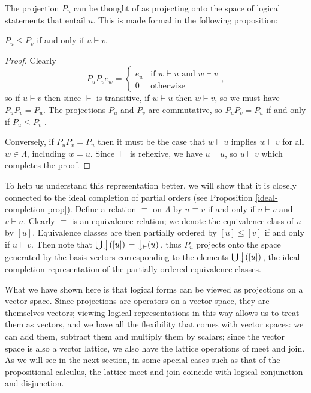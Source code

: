 The projection $P_u$ can be thought of as projecting onto the space of logical statements that entail $u$. This is made formal in the following proposition:
\begin{prop}\label{modelth}
$P_u \le P_v$ if and only if $u \vdash v$.
\end{prop}
\begin{proof}
Clearly
\begin{equation}
\tag{$*$}\label{projectionprod}
P_uP_v e_w = \left\{
\begin{array}{ll}
e_w & \text{if $w \vdash u$ and $w \vdash v$}\\
0 & \text{otherwise}
\end{array},
 \right.
 \end{equation}
so if $u \vdash v$ then since $\vdash$ is transitive, if $w \vdash u$ then $w \vdash v$, so we must have $P_uP_v = P_u$. The projections $P_u$ and $P_v$ are commutative, so $P_uP_v = P_u$ if and only if $P_u \le P_v$ \citep{Aliprantis:85}.

Conversely, if $P_uP_v = P_u$ then it must be the case that $w \vdash u$ implies $w \vdash v$ for all $w \in \Lambda$, including $w = u$. Since $\vdash$ is reflexive, we have $u \vdash u$, so $u \vdash v$ which completes the proof.
\end{proof}

To help us understand this representation better, we will show that it is closely connected to the ideal completion of partial orders (see Proposition \ref{ideal-completion-prop}). Define a relation $\equiv$ on $\Lambda$ by $u \equiv v$ if and only if $u \vdash v$ and $v \vdash u$. Clearly $\equiv$ is an equivalence relation; we denote the equivalence class of $u$ by $[u]$. Equivalence classes are then partially ordered by $[u] \le [v]$ if and only if $u \vdash v$. Then note that $\bigcup \left\downarrow([u])\right. = \left\downarrow_\vdash(u)\right.$, thus $P_u$ projects onto the space generated by the basis vectors corresponding to the elements $\bigcup \left\downarrow([u])\right.$, the ideal completion representation of the partially ordered equivalence classes.

What we have shown here is that logical forms can be viewed as projections on a vector space. Since projections are operators on a vector space, they are themselves vectors; viewing logical representations in this way allows us to treat them as vectors, and we have all the flexibility that comes with vector spaces: we can add them, subtract them and multiply them by scalars; since the vector space is also a vector lattice, we also have the lattice operations of meet and join. As we will see in the next section, in some special cases such as that of the propositional calculus, the lattice meet and join coincide with logical conjunction and disjunction.

